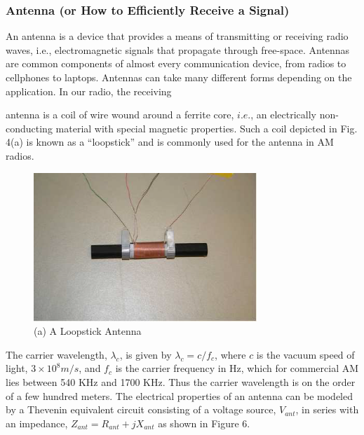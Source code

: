 \documentclass[utf8]{article}
\begin{document}
\subsubsection{Antenna (or How to Efficiently Receive a Signal)}
{
	An antenna is a device that provides a means of transmitting or receiving radio waves, i.e., electromagnetic signals that propagate through free-space. Antennas are common components of almost every communication device, from radios to cellphones to laptops.
	Antennas can take many different forms depending on the application. In our radio, the receiving

	antenna is a coil of wire wound around a ferrite core, $i.e.$, an electrically non-conducting material with special magnetic properties. Such a coil depicted in Fig. 4(a) is known as a “loopstick” and is commonly used for the antenna in AM radios.

	\begin{figure}[H]
		\begin{small}
			\begin{center}
				\includegraphics[width=0.75\textwidth]{figures/Figure4.png}
			\end{center}
			\caption{(a) A Loopstick Antenna}
			\label{fig:antenna}
		\end{small}
	\end{figure}

	The carrier wavelength, $\lambda_c$, is given by $\lambda_c = c/f_c$, where $c$ is the vacuum speed of light, $3\times10^8 m/s$, and $f_c$ is the carrier frequency in Hz, which for commercial AM lies between 540 KHz and 1700 KHz. Thus the carrier wavelength is on the order of a few hundred meters. The electrical properties of an antenna can be modeled by a Thevenin equivalent circuit consisting of a voltage source, $V_{ant}$, in series with an impedance, $Z_{ant} = R_{ant} + jX_{ant}$ as shown in Figure 6.

}
\end{document}
